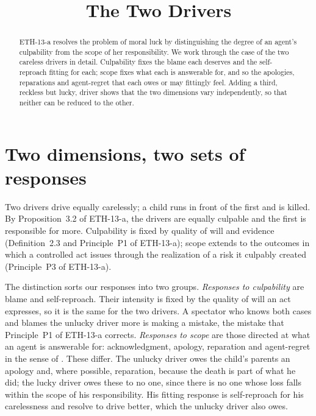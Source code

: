 \documentclass{situationist-preprint}
\title{The Two Drivers}
\begin{document}
\maketitle

\begin{abstract}
ETH-13-a resolves the problem of moral luck by distinguishing the degree of an agent's culpability from the scope of her responsibility. We work through the case of the two careless drivers in detail. Culpability fixes the blame each deserves and the self-reproach fitting for each; scope fixes what each is answerable for, and so the apologies, reparations and agent-regret that each owes or may fittingly feel. Adding a third, reckless but lucky, driver shows that the two dimensions vary independently, so that neither can be reduced to the other.
\end{abstract}

\section{Two dimensions, two sets of responses}

Two drivers drive equally carelessly; a child runs in front of the first and is killed. By Proposition~3.2 of ETH-13-a, the drivers are equally culpable and the first is responsible for more. Culpability is fixed by quality of will and evidence (Definition~2.3 and Principle~P1 of ETH-13-a); scope extends to the outcomes in which a controlled act issues through the realization of a risk it culpably created (Principle~P3 of ETH-13-a).

The distinction sorts our responses into two groups. \emph{Responses to culpability} are blame and self-reproach. Their intensity is fixed by the quality of will an act expresses, so it is the same for the two drivers. A spectator who knows both cases and blames the unlucky driver more is making a mistake, the mistake that Principle~P1 of ETH-13-a corrects. \emph{Responses to scope} are those directed at what an agent is answerable for: acknowledgment, apology, reparation and agent-regret in the sense of \citet{Williams1976}. These differ. The unlucky driver owes the child's parents an apology and, where possible, reparation, because the death is part of what he did; the lucky driver owes these to no one, since there is no one whose loss falls within the scope of his responsibility. His fitting response is self-reproach for his carelessness and resolve to drive better, which the unlucky driver also owes.
\end{document}
